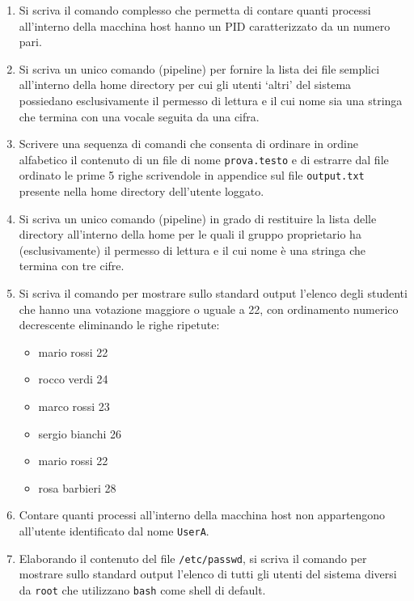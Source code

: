 \documentclass{report}
\begin{document}
\begin{enumerate}
    \item Si scriva il comando complesso che permetta di contare quanti processi all’interno della macchina host hanno un PID caratterizzato da un numero pari.
    
    \item Si scriva un unico comando (pipeline) per fornire la lista dei file semplici all’interno della home directory per cui gli utenti ‘altri’ del sistema possiedano esclusivamente il permesso di lettura e il cui nome sia una stringa che termina con una vocale seguita da una cifra.
    
    \item Scrivere una sequenza di comandi che consenta di ordinare in ordine alfabetico il contenuto di un file di nome \texttt{prova.testo} e di estrarre dal file ordinato le prime 5 righe scrivendole in appendice sul file \texttt{output.txt} presente nella home directory dell’utente loggato.
    
    \item Si scriva un unico comando (pipeline) in grado di restituire la lista delle directory all’interno della home per le quali il gruppo proprietario ha (esclusivamente) il permesso di lettura e il cui nome è una stringa che termina con tre cifre.
    
    \item Si scriva il comando per mostrare sullo standard output l’elenco degli studenti che hanno una votazione maggiore o uguale a 22, con ordinamento numerico decrescente eliminando le righe ripetute:
    \begin{itemize}
        \item mario rossi 22
        \item rocco verdi 24
        \item marco rossi 23
        \item sergio bianchi 26
        \item mario rossi 22
        \item rosa barbieri 28
    \end{itemize}
    
    \item Contare quanti processi all’interno della macchina host non appartengono all’utente identificato dal nome \texttt{UserA}.
    
    \item Elaborando il contenuto del file \texttt{/etc/passwd}, si scriva il comando per mostrare sullo standard output l’elenco di tutti gli utenti del sistema diversi da \texttt{root} che utilizzano \texttt{bash} come shell di default.
    

\end{enumerate}
\end{document}
